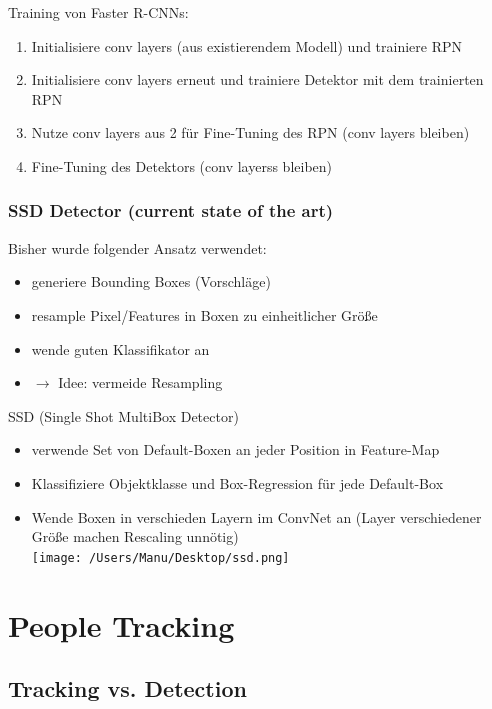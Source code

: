 \documentclass[paper=a4, fontsize=11pt]{scrartcl} %
\numberwithin{equation}{section} %
\numberwithin{figure}{section} %
\numberwithin{table}{section} %
\begin{document}
Training von Faster R-CNNs:
\begin{enumerate}
\item Initialisiere conv layers (aus existierendem Modell) und trainiere RPN
\item Initialisiere conv layers erneut und trainiere Detektor mit dem trainierten RPN
\item Nutze conv layers aus 2 für Fine-Tuning des RPN (conv layers bleiben)
\item Fine-Tuning des Detektors (conv layerss bleiben)
\end{enumerate}

\subsubsection{SSD Detector (current state of the art)}

Bisher wurde folgender Ansatz verwendet:
\begin{itemize}
\item generiere Bounding Boxes (Vorschläge)
\item resample Pixel/Features in Boxen zu einheitlicher Größe
\item wende guten Klassifikator an
\item $\rightarrow$ Idee: vermeide Resampling
\end{itemize}

SSD (Single Shot MultiBox Detector)
\begin{itemize}
\item verwende Set von Default-Boxen an jeder Position in Feature-Map
\item Klassifiziere Objektklasse und Box-Regression für jede Default-Box
\item Wende Boxen in verschieden Layern im ConvNet an (Layer verschiedener Größe machen Rescaling unnötig)\\ 
\texttt{[image: /Users/Manu/Desktop/ssd.png]}
\end{itemize}

\section{People Tracking}

\subsection{Tracking vs. Detection}
\end{document}
